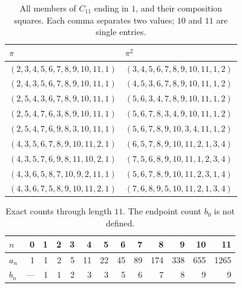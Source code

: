 \begin{table}[tbp]
\centering\small
\caption{All members of $C_{11}$ ending in $1$, and their composition squares.
Each comma separates two values; $10$ and $11$ are single entries.}
\label{tab:endpoints}
\begin{tabular}{@{}ll@{}}
\toprule
$\pi$ & $\pi^2$ \\
\midrule
 $(2,3,4,5,6,7,8,9,10,11,1)$ & $(3,4,5,6,7,8,9,10,11,1,2)$ \\
 $(2,4,3,5,6,7,8,9,10,11,1)$ & $(4,5,3,6,7,8,9,10,11,1,2)$ \\
 $(2,5,4,3,6,7,8,9,10,11,1)$ & $(5,6,3,4,7,8,9,10,11,1,2)$ \\
 $(2,5,4,7,6,3,8,9,10,11,1)$ & $(5,6,7,8,3,4,9,10,11,1,2)$ \\
 $(2,5,4,7,6,9,8,3,10,11,1)$ & $(5,6,7,8,9,10,3,4,11,1,2)$ \\
 $(4,3,5,6,7,8,9,10,11,2,1)$ & $(6,5,7,8,9,10,11,2,1,3,4)$ \\
 $(4,3,5,7,6,9,8,11,10,2,1)$ & $(7,5,6,8,9,10,11,1,2,3,4)$ \\
 $(4,3,6,5,8,7,10,9,2,11,1)$ & $(5,6,7,8,9,10,11,2,3,1,4)$ \\
 $(4,3,6,7,5,8,9,10,11,2,1)$ & $(7,6,8,9,5,10,11,2,1,3,4)$ \\
\bottomrule
\end{tabular}
\end{table}

\begin{table}[tbp]
\centering\small
\caption{Exact counts through length $11$. The endpoint count $b_0$ is not defined.}
\label{tab:counts}
\begin{tabular}{@{}lrrrrrrrrrrrr@{}}
\toprule
$n$ & 0 & 1 & 2 & 3 & 4 & 5 & 6 & 7 & 8 & 9 & 10 & 11 \\
\midrule
$a_n$ & 1 & 1 & 2 & 5 & 11 & 22 & 45 & 89 & 174 & 338 & 655 & 1265 \\
$b_n$ & --- & 1 & 1 & 2 & 3 & 3 & 5 & 6 & 7 & 8 & 9 & 9 \\
\bottomrule
\end{tabular}
\end{table}
